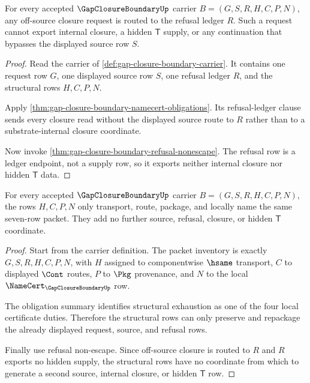 \begin{theorem}
\label{thm:gap-closure-boundary-refusal-ledger-routing}
For every accepted $\GapClosureBoundaryUp$ carrier $B=(G,S,R,H,C,P,N)$, any
off-source closure request is routed to the refusal ledger $R$. Such a request
cannot export internal closure, a hidden $\mathsf{T}$ supply, or any
continuation that bypasses the displayed source row $S$.
\end{theorem}
\begin{proof}
Read the carrier of \autoref{def:gap-closure-boundary-carrier}. It contains one
request row $G$, one displayed source row $S$, one refusal ledger $R$, and the
structural rows $H,C,P,N$.

Apply \autoref{thm:gap-closure-boundary-namecert-obligations}. Its
refusal-ledger clause sends every closure read without the displayed source
route to $R$ rather than to a substrate-internal closure coordinate.

Now invoke \autoref{thm:gap-closure-boundary-refusal-nonescape}. The refusal
row is a ledger endpoint, not a supply row, so it exports neither internal
closure nor hidden $\mathsf{T}$ data.
\end{proof}

\begin{theorem}
\label{thm:gap-closure-boundary-structural-exhaustion}
For every accepted $\GapClosureBoundaryUp$ carrier $B=(G,S,R,H,C,P,N)$, the
rows $H,C,P,N$ only transport, route, package, and locally name the same
seven-row packet. They add no further source, refusal, closure, or hidden
$\mathsf{T}$ coordinate.
\end{theorem}
\begin{proof}
Start from the carrier definition. The packet inventory is exactly
$G,S,R,H,C,P,N$, with $H$ assigned to componentwise $\hsame$ transport, $C$ to
displayed $\Cont$ routes, $P$ to $\Pkg$ provenance, and $N$ to the local
$\NameCert_{\GapClosureBoundaryUp}$ row.

The obligation summary identifies structural exhaustion as one of the four
local certificate duties. Therefore the structural rows can only preserve and
repackage the already displayed request, source, and refusal rows.

Finally use refusal non-escape. Since off-source closure is routed to $R$ and
$R$ exports no hidden supply, the structural rows have no coordinate from which
to generate a second source, internal closure, or hidden $\mathsf{T}$ row.
\end{proof}

